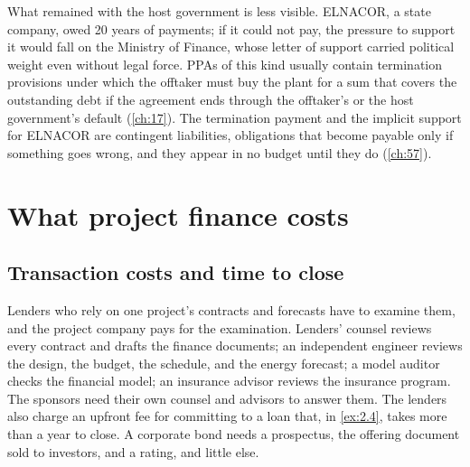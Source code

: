 What remained with the host government is less visible. ELNACOR, a state company, owed 20 years of payments; if it could not pay, the pressure to support it would fall on the Ministry of Finance, whose letter of support carried political weight even without legal force. PPAs of this kind usually contain termination provisions under which the offtaker must buy the plant for a sum that covers the outstanding debt if the agreement ends through the offtaker's or the host government's default (\cref{ch:17}). The termination payment and the implicit support for ELNACOR are contingent liabilities, obligations that become payable only if something goes wrong, and they appear in no budget until they do (\cref{ch:57}).

\section{What project finance costs}\label{sec:2.6}

\subsection{Transaction costs and time to close}\label{ssec:2.6.1}

Lenders who rely on one project's contracts and forecasts have to examine them, and the project company pays for the examination. Lenders' counsel reviews every contract and drafts the finance documents; an independent engineer reviews the design, the budget, the schedule, and the energy forecast; a model auditor checks the financial model; an insurance advisor reviews the insurance program. The sponsors need their own counsel and advisors to answer them. The lenders also charge an upfront fee for committing to a loan that, in \cref{ex:2.4}, takes more than a year to close. A corporate bond needs a prospectus, the offering document sold to investors, and a rating, and little else.

